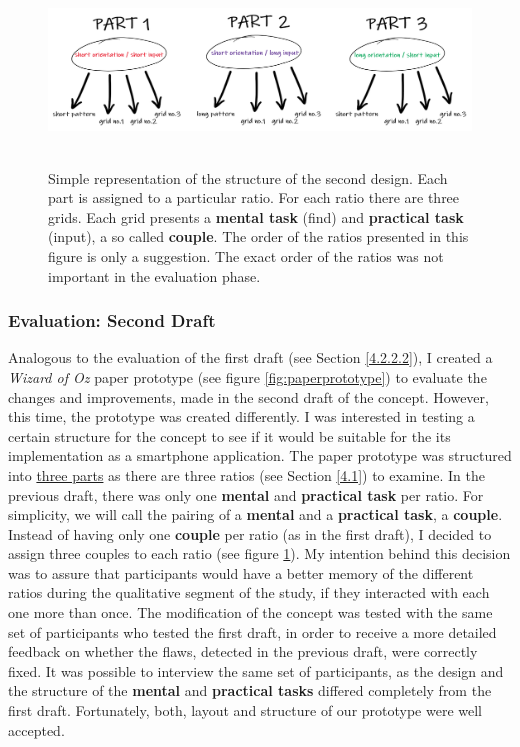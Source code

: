 \begin{figure}[t!]
\centering
\includegraphics[width=13cm, height=5cm]{Chapters/graphics/prototypeStructure.PNG}
\caption{Simple representation of the structure of the second design. Each part is assigned to a particular ratio. For each ratio there are three grids. Each grid presents a \textbf{mental task} (find) and \textbf{practical task} (input), a so called \textbf{couple}. The order of the ratios presented in this figure is only a suggestion. The exact order of the ratios was not important in the evaluation phase.}
\label{fig:prototype}
\end{figure}

\subsubsection{Evaluation: Second Draft} \label{4.2.2.4}

Analogous to the evaluation of the first draft (see Section \ref{4.2.2.2}), I created a \textit{Wizard of Oz} \cite{Butz2014} paper prototype (see figure \ref{fig:paperprototype}) to evaluate the changes and improvements, made in the second draft of the concept. However, this time, the prototype was created differently. I was interested in testing a certain structure for the concept to see if it would be suitable for the its implementation as a smartphone application. The paper prototype was structured into \underline{three parts} as there are three ratios (see Section \ref{4.1}) to examine. In the previous draft, there was only one \textbf{mental} and \textbf{practical task} per ratio. For simplicity, we will call the pairing of a  \textbf{mental} and a \textbf{practical task}, a \textbf{couple}. Instead of having only one \textbf{couple} per ratio (as in the first draft), I decided to assign three couples to each ratio (see figure \ref{fig:prototype}). My intention behind this decision was to assure that participants would have a better memory of the different ratios during the qualitative segment of the study, if they interacted with each one more than once. The modification of the concept was tested with the same set of participants who tested the first draft, in order to receive a more detailed feedback on whether the flaws, detected in the previous draft, were correctly fixed. It was possible to interview the same set of participants, as the design and the structure of the \textbf{mental} and \textbf{practical tasks} differed completely from the first draft. Fortunately, both, layout and structure of our prototype were well accepted. \\

